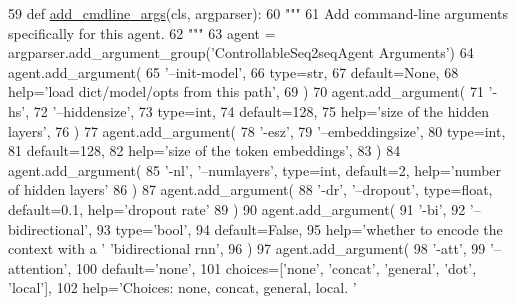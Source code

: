 \begin{DoxyCode}
59     \textcolor{keyword}{def }\hyperlink{namespaceparlai_1_1agents_1_1drqa_1_1config_a62fdd5554f1da6be0cba185271058320}{add\_cmdline\_args}(cls, argparser):
60         \textcolor{stringliteral}{"""}
61 \textcolor{stringliteral}{        Add command-line arguments specifically for this agent.}
62 \textcolor{stringliteral}{        """}
63         agent = argparser.add\_argument\_group(\textcolor{stringliteral}{'ControllableSeq2seqAgent Arguments'})
64         agent.add\_argument(
65             \textcolor{stringliteral}{'--init-model'},
66             type=str,
67             default=\textcolor{keywordtype}{None},
68             help=\textcolor{stringliteral}{'load dict/model/opts from this path'},
69         )
70         agent.add\_argument(
71             \textcolor{stringliteral}{'-hs'},
72             \textcolor{stringliteral}{'--hiddensize'},
73             type=int,
74             default=128,
75             help=\textcolor{stringliteral}{'size of the hidden layers'},
76         )
77         agent.add\_argument(
78             \textcolor{stringliteral}{'-esz'},
79             \textcolor{stringliteral}{'--embeddingsize'},
80             type=int,
81             default=128,
82             help=\textcolor{stringliteral}{'size of the token embeddings'},
83         )
84         agent.add\_argument(
85             \textcolor{stringliteral}{'-nl'}, \textcolor{stringliteral}{'--numlayers'}, type=int, default=2, help=\textcolor{stringliteral}{'number of hidden layers'}
86         )
87         agent.add\_argument(
88             \textcolor{stringliteral}{'-dr'}, \textcolor{stringliteral}{'--dropout'}, type=float, default=0.1, help=\textcolor{stringliteral}{'dropout rate'}
89         )
90         agent.add\_argument(
91             \textcolor{stringliteral}{'-bi'},
92             \textcolor{stringliteral}{'--bidirectional'},
93             type=\textcolor{stringliteral}{'bool'},
94             default=\textcolor{keyword}{False},
95             help=\textcolor{stringliteral}{'whether to encode the context with a '} \textcolor{stringliteral}{'bidirectional rnn'},
96         )
97         agent.add\_argument(
98             \textcolor{stringliteral}{'-att'},
99             \textcolor{stringliteral}{'--attention'},
100             default=\textcolor{stringliteral}{'none'},
101             choices=[\textcolor{stringliteral}{'none'}, \textcolor{stringliteral}{'concat'}, \textcolor{stringliteral}{'general'}, \textcolor{stringliteral}{'dot'}, \textcolor{stringliteral}{'local'}],
102             help=\textcolor{stringliteral}{'Choices: none, concat, general, local. '}

\end{DoxyCode}
